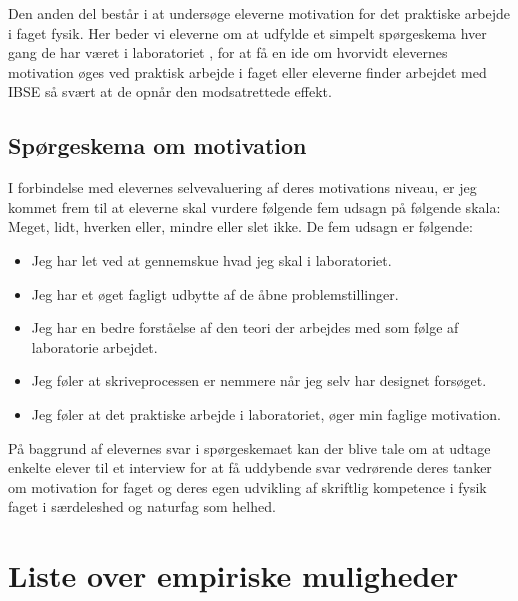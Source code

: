 Den anden del består i at undersøge eleverne motivation for det praktiske arbejde i faget fysik. Her beder vi eleverne om at udfylde et simpelt spørgeskema hver gang de har været i laboratoriet , for at få en ide om hvorvidt elevernes motivation øges ved praktisk arbejde i faget eller eleverne finder arbejdet med IBSE så svært at de opnår den modsatrettede effekt.

\subsection{Spørgeskema om motivation}
\label{sub:3.2.a}
I forbindelse med elevernes selvevaluering af deres motivations niveau, er jeg kommet frem til at eleverne skal vurdere følgende fem udsagn på følgende skala: Meget, lidt, hverken eller, mindre eller slet ikke. De fem udsagn er følgende:
\begin{itemize}
	\item Jeg har let ved at gennemskue hvad jeg skal i laboratoriet.
 	\item Jeg har et øget fagligt udbytte af de åbne problemstillinger.
	\item Jeg har en bedre forståelse af den teori der arbejdes med som følge af laboratorie arbejdet.
	\item Jeg føler at skriveprocessen er nemmere når jeg selv har designet forsøget.
	\item Jeg føler at det praktiske arbejde i laboratoriet, øger min faglige motivation.
\end{itemize}
På baggrund af elevernes svar i spørgeskemaet kan der blive tale om at udtage enkelte elever til et interview for at få uddybende svar vedrørende deres tanker om motivation for faget og deres egen udvikling af skriftlig kompetence i fysik faget i særdeleshed og naturfag som helhed.

\section{Liste over empiriske muligheder}
\label{sec:3.3}

